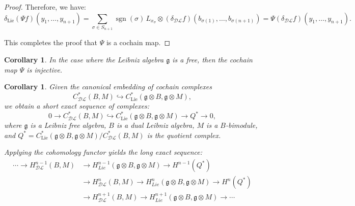 \documentclass[a4paper, 12pt,oneside,reqno]{amsart}
\newcommand{\DL}{\mathcal{DL}}
\newtheorem{corollary}[theorem]{Corollary}
\begin{document}
\begin{proof}
Therefore, we have:
\[
\delta_{\mathrm{Lie}} (\Psi f)(y_1, \dots, y_{n+1}) = \sum_{\sigma \in S_{n+1}} \operatorname{sgn}(\sigma) \, L_{x_\sigma} \otimes (\delta_{\DL} f)(b_{\sigma(1)}, \dots, b_{\sigma(n+1)}) = \Psi(\delta_{\DL} f)(y_1, \dots, y_{n+1}).
\]

This completes the proof that \(\Psi\) is a cochain map.

 
\end{proof}
  \begin{corollary}
 In the case where the Leibniz algebra \(\mathfrak{g}\) is a free, then the cochain map \(\Psi\) is injective.
\end{corollary}
\begin{corollary}\label{4.6} 
    Given the canonical embedding of cochain complexes
\[
C^*_{\DL}(B,M) \hookrightarrow C^*_{\mathrm{Lie}}(\mathfrak{g}\otimes B,\mathfrak{g}\otimes M),
\]
we obtain a short exact sequence of complexes:
\[
0 \to C^*_{\DL}(B,M) \hookrightarrow C^*_{\mathrm{Lie}}(\mathfrak{g}\otimes B,\mathfrak{g}\otimes M)\to Q^* \to 0,
\]
where $\mathfrak{g}$ is a Leibniz free algebra, $B$ is a dual Leibniz algebra, $M$ is a $B$-bimodule, and $ Q^* = C^*_{\mathrm{Lie}}(\mathfrak{g}\otimes B,\mathfrak{g}\otimes M)/C^*_{\DL}(B,M)$ is the quotient complex.

Applying the cohomology functor yields the long exact sequence:
\[
\begin{aligned}
\cdots \to H^{n-1}_{{\DL}}(B,M) &\to H_{Lie}^{n-1}(\mathfrak{g}\otimes B,\mathfrak{g}\otimes M) \to H^{n-1}(Q^*) \\
&\to H^n_{{\DL}}(B,M) \to H^n_{Lie}(\mathfrak{g}\otimes B,\mathfrak{g}\otimes M) \to H^n(Q^*) \\
&\to H^{n+1}_{\DL}(B,M) \to H_{Lie}^{n+1}(\mathfrak{g}\otimes B,\mathfrak{g}\otimes M) \to \cdots
\end{aligned}
\]
\end{corollary}
\end{document}
